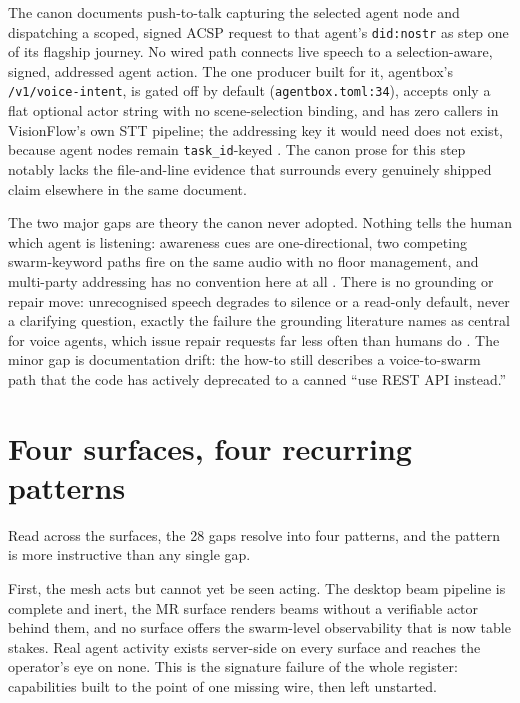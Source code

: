 The canon documents push-to-talk capturing the selected agent node and dispatching a scoped, signed ACSP request to that agent's \texttt{did:nostr} as step one of its flagship journey. No wired path connects live speech to a selection-aware, signed, addressed agent action. The one producer built for it, agentbox's \texttt{/v1/voice-intent}, is gated off by default (\texttt{agentbox.toml:34}), accepts only a flat optional actor string with no scene-selection binding, and has zero callers in VisionFlow's own STT pipeline; the addressing key it would need does not exist, because agent nodes remain \texttt{task\_id}-keyed \parencite{AuthenticatedDelegation2025}. The canon prose for this step notably lacks the file-and-line evidence that surrounds every genuinely shipped claim elsewhere in the same document.

The two major gaps are theory the canon never adopted. Nothing tells the human which agent is listening: awareness cues are one-directional, two competing swarm-keyword paths fire on the same audio with no floor management, and multi-party addressing has no convention here at all \parencite{SpeakStaySilent2026}. There is no grounding or repair move: unrecognised speech degrades to silence or a read-only default, never a clarifying question, exactly the failure the grounding literature names as central for voice agents, which issue repair requests far less often than humans do \parencite{GroundingRifts2025}. The minor gap is documentation drift: the how-to still describes a voice-to-swarm path that the code has actively deprecated to a canned ``use REST API instead.''

\section{Four surfaces, four recurring patterns}

Read across the surfaces, the 28 gaps resolve into four patterns, and the pattern is more instructive than any single gap.

First, the mesh acts but cannot yet be seen acting. The desktop beam pipeline is complete and inert, the MR surface renders beams without a verifiable actor behind them, and no surface offers the swarm-level observability that is now table stakes. Real agent activity exists server-side on every surface and reaches the operator's eye on none. This is the signature failure of the whole register: capabilities built to the point of one missing wire, then left unstarted.

